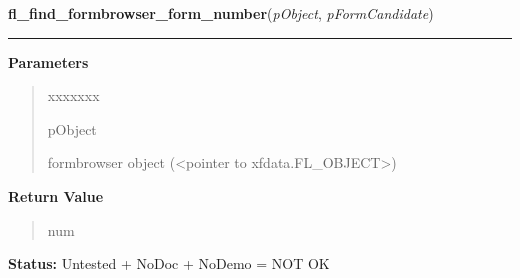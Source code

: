 \hspace{.8\funcindent}\begin{boxedminipage}{\funcwidth}

    \raggedright \textbf{fl\_find\_formbrowser\_form\_number}(\textit{pObject}, \textit{pFormCandidate})

    \vspace{-1.5ex}

    \rule{\textwidth}{0.5\fboxrule}
\setlength{\parskip}{2ex}
\setlength{\parskip}{1ex}
      \textbf{Parameters}
      \vspace{-1ex}

      \begin{quote}
        \begin{Ventry}{xxxxxxx}

          \item[pObject]

          formbrowser object ({\textless}pointer to 
          xfdata.FL\_OBJECT{\textgreater})

        \end{Ventry}

      \end{quote}

      \textbf{Return Value}
    \vspace{-1ex}

      \begin{quote}
      num

      \end{quote}

\textbf{Status:} Untested + NoDoc + NoDemo = NOT OK



    \end{boxedminipage}

    \label{xformslib:library:fl_add_formbrowser}

    \vspace{0.5ex}

